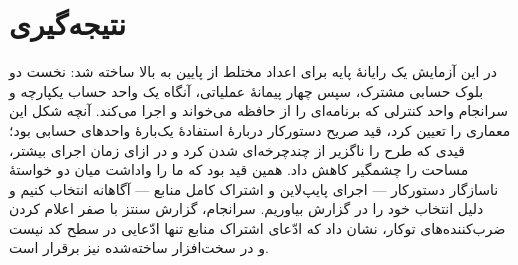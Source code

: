 \documentclass[12pt,a4paper]{article}
\begin{document}
	\section*{نتیجه‌گیری}
	در این آزمایش یک رایانهٔ پایه برای اعداد مختلط از پایین به بالا ساخته شد: نخست دو بلوک حسابی مشترک، سپس چهار پیمانهٔ عملیاتی، آنگاه یک واحد حساب یکپارچه و سرانجام واحد کنترلی که برنامه‌ای را از حافظه می‌خواند و اجرا می‌کند. آنچه شکل این معماری را تعیین کرد، قید صریح دستورکار دربارهٔ استفادهٔ یک‌بارهٔ واحدهای حسابی بود؛ قیدی که طرح را ناگزیر از چندچرخه‌ای شدن کرد و در ازای زمان اجرای بیشتر، مساحت را چشمگیر کاهش داد. همین قید بود که ما را واداشت میان دو خواستهٔ ناسازگار دستورکار --- اجرای پایپ‌لاین و اشتراک کامل منابع --- آگاهانه انتخاب کنیم و دلیل انتخاب خود را در گزارش بیاوریم. سرانجام، گزارش سنتز با صفر اعلام کردن ضرب‌کننده‌های توکار، نشان داد که ادّعای اشتراک منابع تنها ادّعایی در سطح کد نیست و در سخت‌افزار ساخته‌شده نیز برقرار است.
\end{document}
